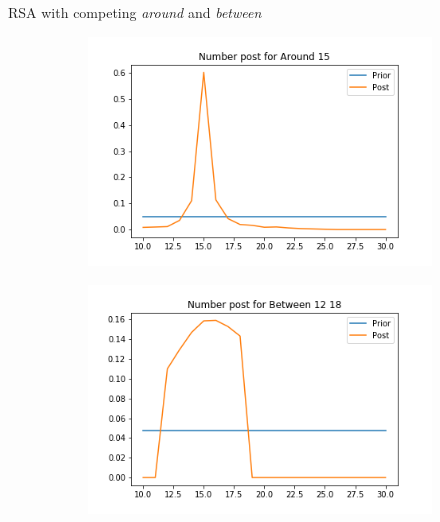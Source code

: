 \documentclass[xcolor=table, hyperref={pdfpagelabels=false}]{beamer}
\begin{document}
\begin{frame}{RSA with competing \textit{around} and \textit{between}}
\begin{minipage}{.6\textwidth}
	\begin{figure}[H]
	\centering
	\begin{subfigure}[b]{0.45\textwidth}
		\includegraphics[width=\textwidth]{./images/number_post_around_15_between.png}
	\end{subfigure}
	\quad
	\begin{subfigure}[b]{0.45\textwidth}
		\includegraphics[width=\textwidth]{./images/number_post_between_12_18.png}
	\end{subfigure}
	

\end{figure}
\end{minipage}
\end{frame}
\end{document}
